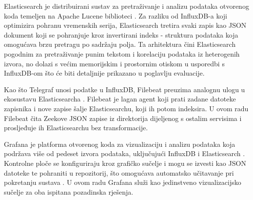 Elasticsearch je distribuirani sustav za pretraživanje i analizu podataka otvorenog koda temeljen na Apache Lucene biblioteci \cite{elasticsearch_docs}. Za razliku od 
InfluxDB-a koji optimizira pohranu vremenskih serija, Elasticsearch tretira svaki zapis kao JSON dokument koji se pohranjuje kroz invertirani indeks  
 - struktura podataka koja omogućava brzu pretragu po sadržaju polja. Ta arhitektura čini Elasticsearch pogodnim za 
pretraživanje punim tekstom i korelaciju podataka iz heterogenih izvora, no dolazi s većim memorijskim i prostornim otiskom u usporedbi s InfluxDB-om što će biti detaljnije 
prikazano u poglavlju evaluacije.

Kao što Telegraf unosi podatke u InfluxDB, Filebeat preuzima analognu ulogu u ekosustavu Elasticsearcha \cite{filebeat_docs}. Filebeat je lagan agent koji prati zadane datoteke 
zapisnika i nove zapise šalje Elasticsearchu, koji ih potom indeksira. U ovom radu Filebeat čita Zeekove JSON zapise iz direktorija dijeljenog s ostalim servisima i prosljeđuje ih 
Elasticsearchu bez transformacije.

Grafana je platforma otvorenog koda za vizualizaciju i analizu podataka koja podržava više od pedeset izvora podataka, uključujući InfluxDB i 
Elasticsearch \cite{grafana_docs}. Kontrolne ploče se konfiguriraju kroz grafičko sučelje i mogu se izvesti kao JSON datoteke te pohraniti u repozitorij, što 
omogućava automatsko učitavanje pri pokretanju sustava . U ovom radu Grafana služi kao jedinstveno vizualizacijsko sučelje za oba ispitana 
pozadinska rješenja.
